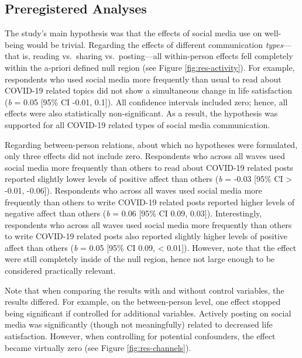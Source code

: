 \documentclass[
  man,mask]{apa6}
\begin{document}
\hypertarget{preregistered-analyses}{%
\subsection{Preregistered Analyses}\label{preregistered-analyses}}

The study's main hypothesis was that the effects of social media use on well-being would be trivial.
Regarding the effects of different communication \emph{types}---that is, reading vs.~sharing vs.~posting---all within-person effects fell completely within the a-priori defined null region (see Figure \ref{fig:res-activity}).
For example, respondents who used social media more frequently than usual to read about COVID-19 related topics did not show a simultaneous change in life satisfaction (\emph{b} = 0.05 {[}95\% CI -0.01, 0.1{]}).
All confidence intervals included zero; hence, all effects were also statistically non-significant.
As a result, the hypothesis was supported for all COVID-19 related types of social media communication.

Regarding between-person relations, about which no hypotheses were formulated, only three effects did not include zero.
Respondents who across all waves used social media more frequently than others to read about COVID-19 related posts reported slightly lower levels of positive affect than others (\emph{b} = -0.03 {[}95\% CI \textgreater{} -0.01, -0.06{]}).
Respondents who across all waves used social media more frequently than others to write COVID-19 related posts reported higher levels of negative affect than others (\emph{b} = 0.06 {[}95\% CI 0.09, 0.03{]}).
Interestingly, respondents who across all waves used social media more frequently than others to write COVID-19 related posts also reported slightly higher levels of positive affect than others (\emph{b} = 0.05 {[}95\% CI 0.09, \textless{} 0.01{]}).
However, note that the effect were still completely inside of the null region, hence not large enough to be considered practically relevant.

Note that when comparing the results with and without control variables, the results differed.
For example, on the between-person level, one effect stopped being significant if controlled for additional variables.
Actively posting on social media was significantly (though not meaningfully) related to decreased life satisfaction.
However, when controlling for potential confounders, the effect became virtually zero (see Figure \ref{fig:res-channels}).
\end{document}
